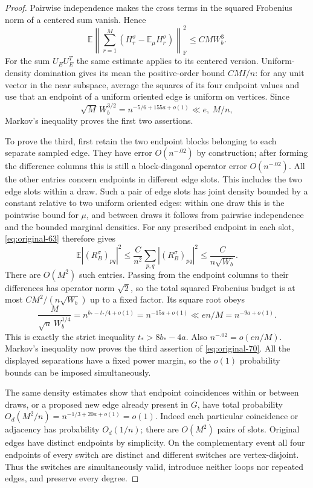\begin{proof}
Pairwise independence makes the cross terms in the squared Frobenius norm of
a centered sum vanish.  Hence
\[
 \mathbb E\left\|\sum_{r=1}^M
 (H_r^\sigma-\mathbb E_\mu H_r^\sigma)\right\|_{\mathrm F}^2
 \le CM W_b^3.
\]
For the sum $U_EU_E^T$ the same estimate applies to its centered version.
Uniform-density domination gives its mean the positive-order bound $CMI/n$:
for any unit vector in the near subspace, average the squares of its four
endpoint values and use that an endpoint of a uniform oriented edge is uniform
on vertices.  Since
\[
 \sqrt M\,W_b^{3/2}=n^{-5/6+155a+o(1)}
       \ll e,\ M/n,
\]
Markov's inequality proves the first two assertions.

To prove the third, first retain the two endpoint blocks belonging to each
separate sampled edge.  They have error $O(n^{-.02})$ by construction; after
forming the difference columns this is still a block-diagonal operator error
$O(n^{-.02})$.
All the other entries concern endpoints in different edge slots.  This
includes the two edge slots within a draw.  Such a pair of edge slots has joint
density bounded by a constant relative to two uniform oriented edges: within
one draw this is the pointwise bound for $\mu$, and between draws it follows
from pairwise independence and the bounded marginal densities.
For any prescribed endpoint in each slot, \eqref{eq:original-63} therefore
gives
\[
 \mathbb E\left| (R_B^\sigma)_{pq}\right|^2
 \le \frac{C}{n^2}\sum_{p,q}|(R_B^\sigma)_{pq}|^2
 \le \frac{C}{n\sqrt{W_b}}.
\]
There are $O(M^2)$ such entries.  Passing from the endpoint columns to their
differences has operator norm $\sqrt2$, so the total squared Frobenius budget
is at most $CM^2/(n\sqrt{W_b})$ up to a fixed factor.  Its square root obeys
\[
 \frac{M}{\sqrt n\,W_b^{1/4}}
   =n^{b_*-t_*/4+o(1)}=n^{-15a+o(1)}
   \ll en/M=n^{-9a+o(1)}.
\]
This is exactly the strict inequality $t_*>8b_*-4a$.
Also $n^{-.02}=o(en/M)$.  Markov's inequality now proves the third assertion
of \eqref{eq:original-70}.  All the displayed separations have a fixed power
margin, so the $o(1)$ probability bounds can be imposed simultaneously.

The same density estimates show that endpoint coincidences within or between
draws, or a proposed new edge already present in $G$, have total probability
$O_d(M^2/n)=n^{-1/3+20a+o(1)}=o(1)$.
Indeed each particular coincidence or adjacency has probability $O_d(1/n)$;
there are $O(M^2)$ pairs of slots.  Original edges have distinct endpoints by
simplicity.  On the complementary event all four endpoints of every switch
are distinct and different switches are vertex-disjoint.  Thus the switches
are simultaneously valid, introduce neither loops nor repeated edges, and
preserve every degree.


\end{proof}
